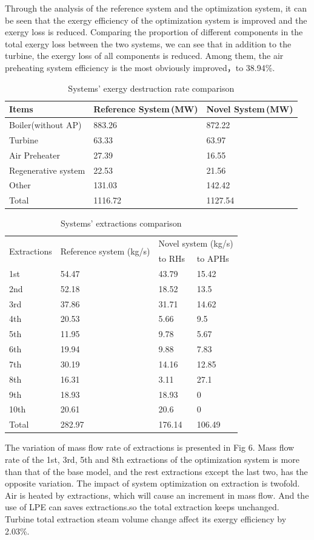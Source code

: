 \documentclass[preprint,12pt]{elsarticle}
\begin{document}
Through the analysis of the reference system and the optimization system, it can be seen that the exergy efficiency of the optimization system is improved and the exergy loss is reduced.
Comparing the proportion of different components in the total exergy loss between the two systems, we can see that in addition to the turbine, the exergy loss of all components is reduced. 
Among them, the air preheating system efficiency is the most obviously improved，to 38.94\%.


\begin{table}
\caption{Systems' exergy destruction rate comparison }
\label{table:system exergy campare}
\centering
\begin{tabular}{lll}
\toprule 
Items & Reference System\,(MW) & Novel System\,(MW)\tabularnewline
\midrule 
Boiler(without AP) & 883.26 & 872.22\tabularnewline
Turbine & 63.33 & 63.97\tabularnewline
Air Preheater  & 27.39 & 16.55\tabularnewline
Regenerative system & 22.53 & 21.56\tabularnewline
Other & 131.03 & 142.42 \tabularnewline
Total & 1116.72 & 1127.54\tabularnewline
\bottomrule
\end{tabular}
\end{table}



\begin{table}
\label{table:extraction compare}
\caption{Systems' extractions comparison}
\begin{centering}
\begin{tabular}{llll}
\toprule 
\multirow{2}{*}{Extractions} & \multirow{2}{2.5cm}{Reference system (kg/s)} & \multicolumn{2}{c}{Novel system (kg/s)}\tabularnewline
\cmidrule{3-4} 
 &  & to RHs & to APHs\tabularnewline
\midrule
1st & 54.47 & 43.79 & 15.42\tabularnewline
2nd & 52.18 & 18.52 & 13.5\tabularnewline
3rd & 37.86 & 31.71 & 14.62\tabularnewline
4th & 20.53 & 5.66 & 9.5\tabularnewline
5th & 11.95 & 9.78 & 5.67\tabularnewline
6th & 19.94 & 9.88 & 7.83\tabularnewline
7th & 30.19 & 14.16 & 12.85\tabularnewline
8th & 16.31 & 3.11 & 27.1\tabularnewline
9th & 18.93 & 18.93 & 0\tabularnewline
10th & 20.61 & 20.6 & 0\tabularnewline
Total & 282.97 & 176.14 & 106.49\tabularnewline
\bottomrule
\end{tabular}
\par\end{centering}
\end{table}
The variation of mass flow rate of extractions is presented in Fig 6.
 Mass flow rate of the 1st, 3rd, 5th and 8th extractions of the optimization system is more than that of the base model, and the rest extractions except the last two, has the opposite variation. 
 The impact of system optimization on extraction is twofold. 
 Air is heated by extractions, which will cause an increment in mass flow. 
 And the use of LPE can saves extractions.so the total extraction keeps unchanged.
 Turbine total extraction steam volume change affect its exergy efficiency by 2.03\%.
\end{document}
